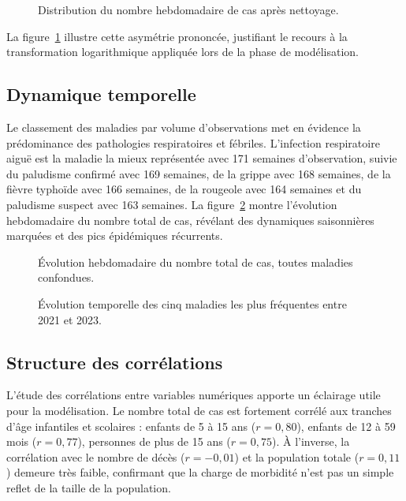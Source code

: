 \begin{figure}[htbp]
  \centering
  \caption{Distribution du nombre hebdomadaire de cas après nettoyage.}
  \label{fig:eda-distribution}
\end{figure}

La figure~\ref{fig:eda-distribution} illustre cette asymétrie prononcée, justifiant
le recours à la transformation logarithmique appliquée lors de la phase de
modélisation.

\subsection{Dynamique temporelle}

Le classement des maladies par volume d'observations met en évidence la
prédominance des pathologies respiratoires et fébriles. L'infection respiratoire
aiguë est la maladie la mieux représentée avec 171 semaines d'observation, suivie
du paludisme confirmé avec 169 semaines, de la grippe avec 168 semaines, de la
fièvre typhoïde avec 166 semaines, de la rougeole avec 164 semaines et du paludisme
suspect avec 163 semaines. La figure~\ref{fig:eda-tendance} montre l'évolution
hebdomadaire du nombre total de cas, révélant des dynamiques saisonnières marquées
et des pics épidémiques récurrents.

\begin{figure}[htbp]
  \centering
  \caption{Évolution hebdomadaire du nombre total de cas, toutes maladies confondues.}
  \label{fig:eda-tendance}
\end{figure}

\begin{figure}[htbp]
  \centering
  \caption{Évolution temporelle des cinq maladies les plus fréquentes entre 2021 et 2023.}
  \label{fig:eda-top5}
\end{figure}

\subsection{Structure des corrélations}

L'étude des corrélations entre variables numériques apporte un éclairage utile pour
la modélisation. Le nombre total de cas est fortement corrélé aux tranches d'âge
infantiles et scolaires : enfants de 5 à 15 ans ($r = 0{,}80$), enfants de
12 à 59 mois ($r = 0{,}77$), personnes de plus de 15 ans ($r = 0{,}75$). À
l'inverse, la corrélation avec le nombre de décès ($r = -0{,}01$) et la population
totale ($r = 0{,}11$) demeure très faible, confirmant que la charge de morbidité
n'est pas un simple reflet de la taille de la population.

